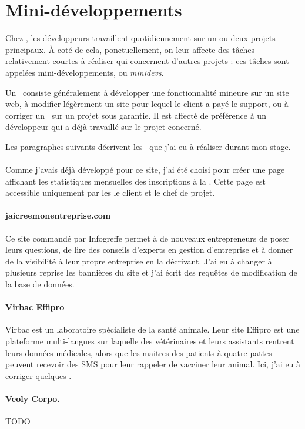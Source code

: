 \section{Mini-développements}

Chez \asl, les développeurs travaillent quotidiennement sur un ou deux projets principaux. À coté de cela, ponctuellement, on leur affecte des tâches relativement courtes à réaliser qui concernent d'autres projets : ces tâches sont appelées mini-développements, ou \emph{minidevs}.

Un \aminidev\ consiste généralement à développer une fonctionnalité mineure sur un site web, à modifier légèrement un site pour lequel le client a payé le support, ou à corriger un \abug\ sur un projet sous garantie. Il est affecté de préférence à un développeur qui a déjà travaillé sur le projet concerné. 

Les paragraphes suivants décrivent les \aminidevs\ que j'ai eu à réaliser durant mon stage.

\paragraph{\alc} Comme j'avais déjà développé pour ce site, j'ai été choisi pour créer une page affichant les statistiques mensuelles des inscriptions à la \anewsletter. Cette page est accessible uniquement par les le client et le chef de projet.

\paragraph{jaicreemonentreprise.com} Ce site commandé par Infogreffe permet à de nouveaux entrepreneurs de poser leurs questions, de lire des conseils d'experts en gestion d'entreprise et à donner de la visibilité à leur propre entreprise en la décrivant. J'ai eu à changer à plusieurs reprise les bannières du site et j'ai écrit des requêtes de modification de la base de données.

\paragraph{Virbac Effipro} Virbac est un laboratoire spécialiste de la santé animale. Leur site Effipro est une plateforme multi-langues sur laquelle des vétérinaires et leurs assistants rentrent leurs données médicales, alors que les maitres des patients à quatre pattes peuvent recevoir des SMS pour leur rappeler de vacciner leur animal. Ici, j'ai eu à corriger quelques \abugs.

\paragraph{Veoly Corpo.} TODO
